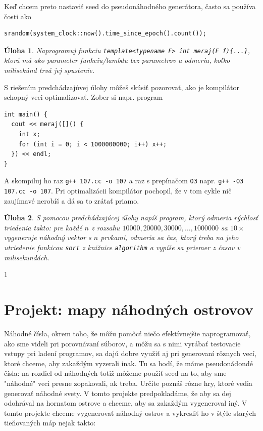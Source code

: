 \documentclass[10pt]{article}
\def\prg{\lstinline}
\def\ods{\vspace*{10pt}}
\newtheorem{uloha}{Úloha}
\def\sectxxix{1} %
\def\sectxxix{0} %
\begin{document}
{\ods
Keď chcem preto nastaviť seed do pseudonáhodného generátora, často sa používa čosti ako

\begin{lstlisting}
srandom(system_clock::now().time_since_epoch().count());
\end{lstlisting}

\begin{uloha}
  Naprogramuj funkciu \prg!template<typename F> int meraj(F f){...}!, ktorá
  má ako parameter funkciu/lambdu bez parametrov a odmeria, koľko milisekúnd trvá
  jej spustenie.
\end{uloha}

\ods
S riešením predchádzajúvej úlohy
môžeš skúsiť pozorovať, ako je kompilátor schopný veci optimalizovať. 
Zober si napr. program

\begin{lstlisting}
int main() {
  cout << meraj([]() {
    int x;
    for (int i = 0; i < 1000000000; i++) x++;
  }) << endl;
}
\end{lstlisting}

A skompiluj ho raz {\tt g++ 107.cc -o 107} a raz s prepínačom {\tt O3} napr.
{\tt g++ -O3 107.cc -o 107}. Pri optimalizácii kompilátor pochopil, že v tom cykle
nič zaujímavé nerobíš a dá sa to zrátať priamo.

\begin{uloha}
S pomocou predchádzajúcej úlohy napíš program, ktorý odmeria rýchlosť triedenia takto:
pre každé $n$ z rozsahu $10000,20000,30000,\ldots,1000000$ sa $10\times$ vygeneruje
náhodný vektor s $n$ prvkami, odmeria sa čas, ktorý treba na jeho utriedenie
  funkicou \prg!sort! z knižnice \prg!algorithm! a vypíše sa priemer z 
  časov v milisekundách.
\end{uloha}

\fi

\if\sectxxix1
\section{Projekt: mapy náhodných ostrovov}

Náhodné čísla, okrem toho, že môžu pomôcť niečo efektívnejšie naprogramovať,
ako sme videli pri porovnávaní súborov, a môžu sa s nimi vyrábať testovacie vstupy 
pri ladení programov, sa dajú dobre využiť aj pri generovaní rôznych vecí,
ktoré chceme, aby zakaždým vyzerali inak. Tu sa hodí, že máme pseudonádondé
čísla: na rozdiel od náhodných totiž môžeme použiť seed na to, aby sme
"náhodné" veci presne zopakovali, ak treba. Určite poznáš rôzne hry, ktoré
vedia generovať náhodné svety. V tomto projekte predpokladáme,
že aby sa dej odohrával na hornatom ostrove 
a chceme, aby sa zakaždým vygeneroval iný. 
V tomto projekte chceme vygenerovať náhodný ostrov a vykresliť ho v štýle starých 
tieňovaných máp nejak takto:

}
\end{document}
